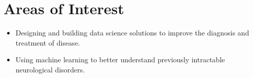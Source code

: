 \section{Areas of Interest}
\closesection

\begin{itemize}
    \item Designing and building data science solutions to improve the diagnosis and treatment of disease.
    \item Using machine learning to better understand previously intractable neurological disorders.
\end{itemize}